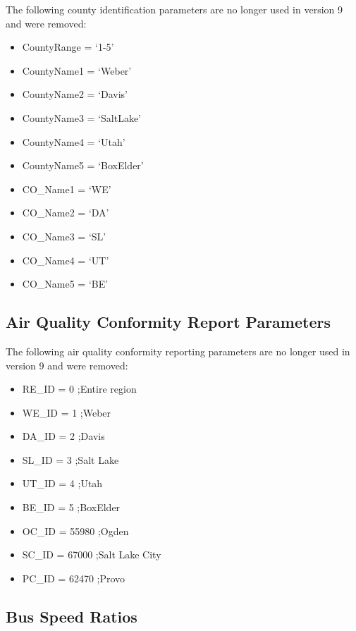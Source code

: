 \documentclass[
  letterpaper,
  DIV=11,
  numbers=noendperiod]{scrreprt}
\providecommand{\tightlist}{%
  \setlength{\itemsep}{0pt}\setlength{\parskip}{0pt}}\usepackage{longtable,booktabs,array}
\begin{document}
The following county identification parameters are no longer used in
version 9 and were removed:

\begin{itemize}
\tightlist
\item
  CountyRange = `1-5'
\item
  CountyName1 = `Weber'
\item
  CountyName2 = `Davis'
\item
  CountyName3 = `SaltLake'
\item
  CountyName4 = `Utah'
\item
  CountyName5 = `BoxElder'
\item
  CO\_Name1 = `WE'
\item
  CO\_Name2 = `DA'
\item
  CO\_Name3 = `SL'
\item
  CO\_Name4 = `UT'
\item
  CO\_Name5 = `BE'
\end{itemize}

\hypertarget{air-quality-conformity-report-parameters}{%
\subsection{Air Quality Conformity Report
Parameters}\label{air-quality-conformity-report-parameters}}

The following air quality conformity reporting parameters are no longer
used in version 9 and were removed:

\begin{itemize}
\tightlist
\item
  RE\_ID = 0 ;Entire region
\item
  WE\_ID = 1 ;Weber
\item
  DA\_ID = 2 ;Davis
\item
  SL\_ID = 3 ;Salt Lake
\item
  UT\_ID = 4 ;Utah
\item
  BE\_ID = 5 ;BoxElder
\item
  OC\_ID = 55980 ;Ogden
\item
  SC\_ID = 67000 ;Salt Lake City
\item
  PC\_ID = 62470 ;Provo
\end{itemize}

\hypertarget{bus-speed-ratios}{%
\subsection{Bus Speed Ratios}\label{bus-speed-ratios}}
\end{document}
